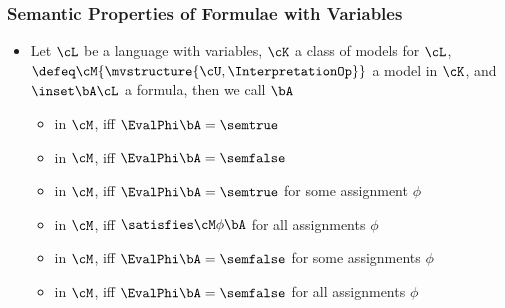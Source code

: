 \documentclass[notes,mh]{mikoslides}
\begin{document}
\begin{module}[id=semantics-base]

\begin{frame}
  \frametitle{Semantic Properties of Formulae with Variables}
  \begin{itemize}
  \item 
    \begin{definition}[id=semantic-properties.def,for={semtrue,semfalse}]
      Let $\cL$ be a language with variables, $\cK$ a class of models for $\cL$,
      $\defeq\cM{\mvstructure{\cU,\InterpretationOp}}$ a model in $\cK$, and $\inset\bA\cL$
      a formula, then we call $\bA$
      \begin{itemize}
      \item {} in $\cM$, iff
        $\EvalPhi\bA=\semtrue$
      \item {} in $\cM$, iff
        $\EvalPhi\bA=\semfalse$
      \item {} in $\cM$, iff $\EvalPhi\bA=\semtrue$ for some assignment
        $\phi$
      \item {} in $\cM$, iff $\satisfies\cM\phi\bA$ for all
        assignments $\phi$
      \item {} in $\cM$, iff $\EvalPhi\bA=\semfalse$ for some
        assignments $\phi$
      \item {} in $\cM$, iff $\EvalPhi\bA=\semfalse$ for all
        assignments $\phi$
      \end{itemize}
    \end{definition}
  \end{itemize}
\end{frame}
\end{module}
\end{document}
